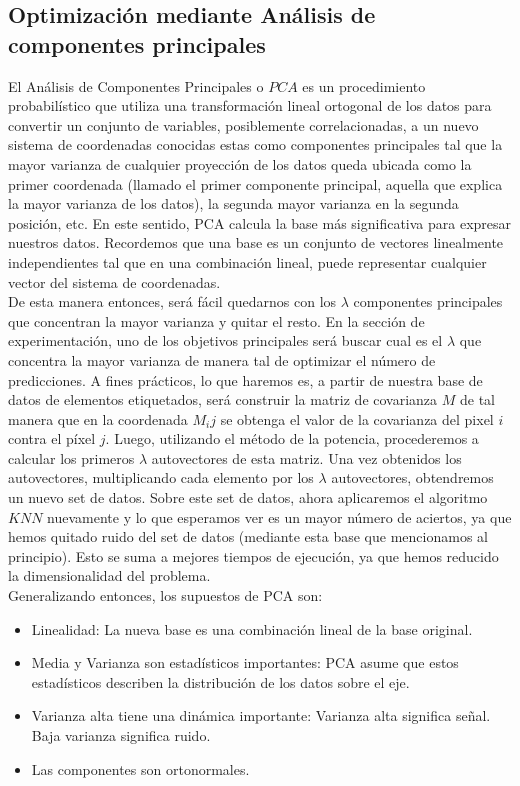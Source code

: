 \subsection{Optimización mediante Análisis de componentes principales}
El Análisis de Componentes Principales o $PCA$ es un procedimiento probabilístico que utiliza una transformación lineal ortogonal de los datos para convertir un conjunto de variables, posiblemente correlacionadas, a un nuevo sistema de coordenadas conocidas estas como componentes principales tal que la mayor varianza de cualquier proyección de los datos queda ubicada como la primer coordenada (llamado el primer componente principal, aquella que explica la mayor varianza de los datos), la segunda mayor varianza en la segunda posición, etc. En este sentido, PCA calcula la base más significativa para expresar nuestros datos. Recordemos que una base es un conjunto de vectores linealmente independientes tal que en una combinación lineal, puede representar cualquier vector del sistema de coordenadas.
\\
De esta manera entonces, será fácil quedarnos con los $\lambda$ componentes principales que concentran la mayor varianza y quitar el resto. En la sección de experimentación, uno de los objetivos principales será buscar cual es el $\lambda$ que concentra la mayor varianza de manera tal de optimizar el número de predicciones. 
A fines prácticos, lo que haremos es, a partir de nuestra base de datos de elementos etiquetados, será construir la matriz de covarianza $M$ de tal manera que en la coordenada $M_ij$ se obtenga el valor de la covarianza del pixel $i$ contra el píxel $j$.
Luego, utilizando el método de la potencia, procederemos a calcular los primeros $\lambda$ autovectores de esta matriz. Una vez obtenidos los autovectores, multiplicando cada elemento por los $\lambda$ autovectores, obtendremos un nuevo set de datos.
Sobre este set de datos, ahora aplicaremos el algoritmo $KNN$ nuevamente y lo que esperamos ver es un mayor número de aciertos, ya que hemos quitado ruido del set de datos (mediante esta base que mencionamos al principio). Esto se suma a mejores tiempos de ejecución, ya que hemos reducido la dimensionalidad del problema.
\\
Generalizando entonces, los supuestos de PCA son:
\begin{itemize}
 \item Linealidad: La nueva base es una combinación lineal de la base original.
 \item Media y Varianza son estadísticos importantes: PCA asume que estos estadísticos describen la distribución de los datos sobre el eje.
 \item Varianza alta tiene una dinámica importante: Varianza alta significa se\~nal. Baja varianza significa ruido.
 \item Las componentes son ortonormales.
\end{itemize}


